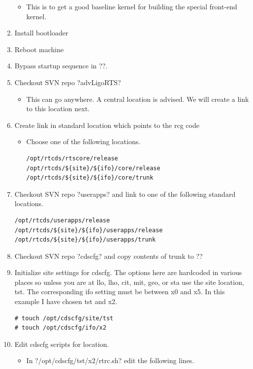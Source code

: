 \begin{enumerate}
\begin{itemize}
\item This is to get a good baseline kernel for building the special
    front-end kernel.
\end{itemize}
\item Install bootloader
\item Reboot machine
\item Bypass startup sequence in \lstin?\etc\inittab?.
\item Checkout SVN repo \lstin?advLigoRTS?
\begin{itemize}
\item This can go anywhere. A central location is advised. We will create a
    link to this location next.
\end{itemize}
\item Create link in standard location which points to the rcg code
\begin{itemize}
\item Choose one of the following locations.
\begin{lstlisting}
/opt/rtcds/rtscore/release
/opt/rtcds/${site}/${ifo}/core/release
/opt/rtcds/${site}/${ifo}/core/trunk
\end{lstlisting}
\end{itemize}
\item Checkout SVN repo \lstin?userapps? and link to one of the following
standard locations.
\begin{lstlisting}
/opt/rtcds/userapps/release
/opt/rtcds/${site}/${ifo}/userapps/release
/opt/rtcds/${site}/${ifo}/userapps/trunk
\end{lstlisting}
\item Checkout SVN repo \lstin?cdscfg? and copy contents of trunk to \lstin?\opt\cdscfg?
\item Initialize site settings for cdscfg. The options here are hardcoded in
various places so unless you are at llo, lho, cit, mit, geo, or sta use the site
location, tst. The corresponding ifo setting must be between x0 and x5. In this
example I have chosen tst and x2.
\begin{lstlisting}
# touch /opt/cdscfg/site/tst
# touch /opt/cdscfg/ifo/x2
\end{lstlisting}
\item Edit cdscfg scripts for location.
\begin{itemize}
\item In \lstin?/opt/cdscfg/tst/x2/rtrc.sh? edit the following lines.
\begin{lstlisting}

\end{lstlisting}
\end{itemize}
\end{enumerate}
